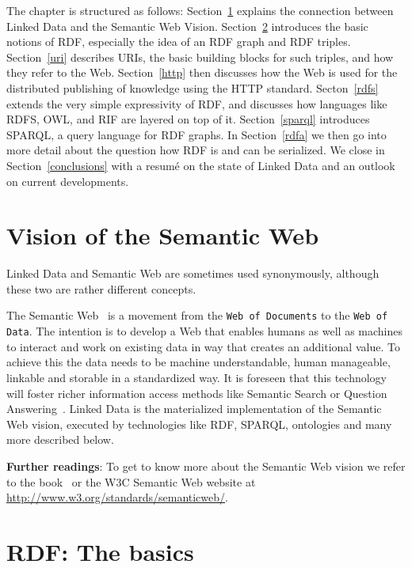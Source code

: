 The chapter is structured as follows:
Section~\ref{semanticweb} explains the connection between Linked Data and the Semantic Web Vision.
Section~\ref{rdf} introduces the basic notions of \ac{RDF}, especially the idea of an \ac{RDF} graph and \ac{RDF} triples.
Section~\ref{uri} describes URIs, the basic building blocks for such triples, and how they refer to the Web.
Section~\ref{http} then discusses how the Web is used for the distributed publishing of knowledge using the HTTP standard.
Secton~\ref{rdfs} extends the very simple expressivity of \ac{RDF}, and discusses how languages like RDFS, OWL, and RIF are layered on top of it.
Section~\ref{sparql} introduces SPARQL, a query language for \ac{RDF} graphs.
In Section~\ref{rdfa} we then go into more detail about the question how \ac{RDF} is and can be serialized.
We close in Section~\ref{conclusions} with a resum\'{e} on the state of Linked Data and an outlook on current developments.

\section{Vision of the Semantic Web}
\label{semanticweb}

Linked Data and Semantic Web are sometimes used synonymously, although these two are rather different concepts.

The Semantic Web~\cite{bernerslee2001semantic} is a movement from the \texttt{Web of Documents} to the \texttt{Web of Data}.
The intention is to develop a Web that enables humans as well as machines to interact and work on existing data in way that creates an additional value.
To achieve this the data needs to be machine understandable, human manageable, linkable and storable in a standardized way.
It is foreseen that this technology will foster richer information access methods like Semantic Search or Question Answering~\cite{combiningLDandIR}.
Linked Data is the materialized implementation of the Semantic Web vision, executed by technologies like \ac{RDF}, SPARQL, ontologies and many more described below.

\medskip

\textbf{Further readings}:
To get to know more about the Semantic Web vision we refer to the book~\cite{swbook} or the W3C Semantic Web website at \url{http://www.w3.org/standards/semanticweb/}.

\section{RDF: The basics}
\label{rdf}

